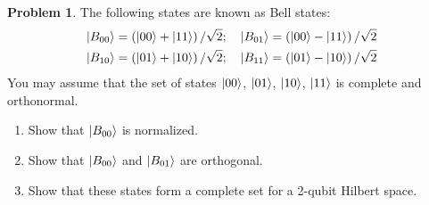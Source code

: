 \documentclass[10pt]{article}
\theoremstyle{definition}
\newtheorem{problem}{Problem}
\begin{document}
\begin{problem}
The following states are known as Bell states:
\begin{align*}
  \ket{B_{00}}=\left(\ket{00}+\ket{11}\right)/\sqrt{2};\quad & \ket{B_{01}}=\left(\ket{00}-\ket{11}\right)/\sqrt{2} \\
  \ket{B_{10}}=\left(\ket{01}+\ket{10}\right)/\sqrt{2};\quad & \ket{B_{11}}=\left(\ket{01}-\ket{10}\right)/\sqrt{2}
\end{align*}
You may assume that the set of states $\ket{00}$, $\ket{01}$, $\ket{10}$, $\ket{11}$ is complete and orthonormal.
\begin{enumerate}[label=(\alph*)]
  \item Show that $\ket{B_{00}}$ is normalized.
  \item Show that $\ket{B_{00}}$ and $\ket{B_{01}}$ are orthogonal.
  \item Show that these states form a complete set for a 2-qubit Hilbert space.
\end{enumerate}
\end{problem}
\end{document}
